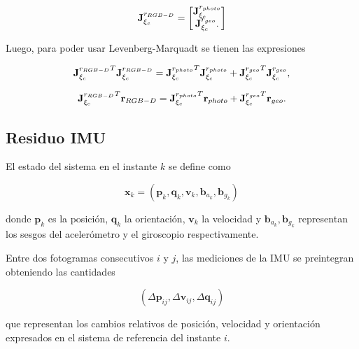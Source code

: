 \begin{equation}
    \mathbf{J}_{\xi_c}^{r_{RGB-D}} =
    \begin{bmatrix}
        \mathbf{J}_{\xi_c}^{r_{photo}} \\
        \mathbf{J}_{\xi_c}^{r_{geo}}.
    \end{bmatrix}
\end{equation}

Luego, para poder usar Levenberg-Marquadt se tienen las expresiones

\begin{equation}
    {\mathbf{J}_{\xi_c}^{r_{RGB-D}}}^T \mathbf{J}_{\xi_c}^{r_{RGB-D}} =
    {\mathbf{J}_{\xi_c}^{r_{photo}}}^T \mathbf{J}_{\xi_c}^{r_{photo}} +
    {\mathbf{J}_{\xi_c}^{r_{geo}}}^T \mathbf{J}_{\xi_c}^{r_{geo}},
\end{equation}
    
\begin{equation}
    {\mathbf{J}_{\xi_c}^{r_{RGB-D}}}^T \mathbf{r}_{RGB-D} =
    {\mathbf{J}_{\xi_c}^{r_{photo}}}^T \mathbf{r}_{photo} +
    {\mathbf{J}_{\xi_c}^{r_{geo}}}^T \mathbf{r}_{geo}.
\end{equation}



\subsection{Residuo IMU}

El estado del sistema en el instante $k$ se define como

\begin{equation}
\mathbf{x}_k =
\left(
\mathbf{p}_k,
\mathbf{q}_k,
\mathbf{v}_k,
\mathbf{b}_{a_k},
\mathbf{b}_{g_k}
\right)
\end{equation}

\noindent donde $\mathbf{p}_k$ es la posición, $\mathbf{q}_k$ la orientación, $\mathbf{v}_k$ la velocidad y $\mathbf{b}_{a_k},\mathbf{b}_{g_k}$ representan los sesgos del acelerómetro y el giroscopio respectivamente.

Entre dos fotogramas consecutivos $i$ y $j$, las mediciones de la IMU se preintegran obteniendo las cantidades

\begin{equation}
(\Delta \mathbf{p}_{ij}, \Delta \mathbf{v}_{ij}, \Delta \mathbf{q}_{ij})
\end{equation}

\noindent que representan los cambios relativos de posición, velocidad y orientación expresados en el sistema de referencia del instante $i$.

